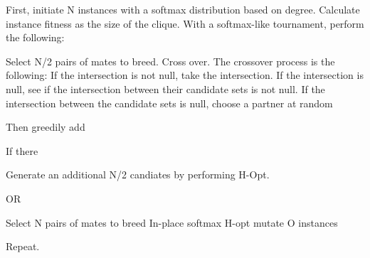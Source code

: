 \documentclass{article}
\begin{document}
First, initiate N instances with a softmax distribution based on degree.
Calculate instance fitness as the size of the clique.
With a softmax-like tournament, perform the following:

Select N/2 pairs of mates to breed.
Cross over. The crossover process is the following:
    If the intersection is not null, take the intersection.
    If the intersection is null, see if the intersection between their candidate sets is not null.
    If the intersection between the candidate sets is null, choose a partner at random

Then greedily add

If there

Generate an additional N/2 candiates by performing H-Opt.

OR

Select N pairs of mates to breed
In-place softmax H-opt mutate O instances

Repeat.

\begin{algorithm}
\caption{Genetic Algorithm}\label{alg:euclid}
\begin{algorithmic}[1] %
    \State 
\EndProcedure
\end{algorithmic}
\end{algorithm}
\end{document}

